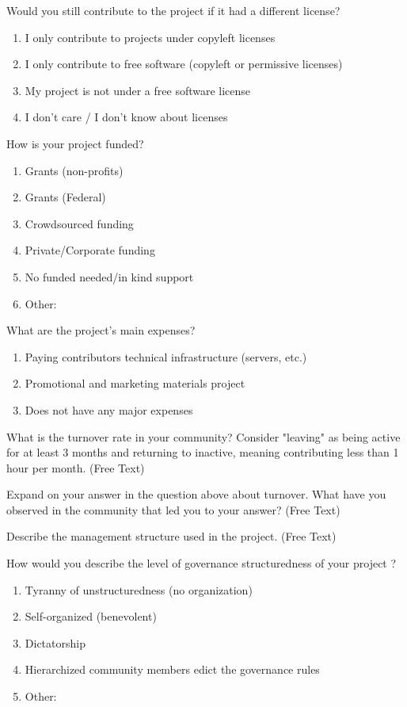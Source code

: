 Would you still contribute to the project if it had a different license?
\begin{enumerate}
\item I only contribute to projects under copyleft licenses
\item I only contribute to free software (copyleft or permissive licenses)
\item My project is not under a free software license
\item I don't care / I don't know about licenses
\end{enumerate}

How is your project funded?
\begin{enumerate}
\item Grants (non-profits)
\item Grants (Federal)
\item Crowdsourced funding
\item Private/Corporate funding
\item No funded needed/in kind support
\item Other:
\end{enumerate}

What are the project's main expenses?
\begin{enumerate}
\item Paying contributors technical infrastructure (servers, etc.)
\item Promotional and marketing materials project
\item Does not have any major expenses
\end{enumerate}

What is the turnover rate in your community? Consider "leaving" as being active for at least 3 months and returning to inactive, meaning contributing less than 1 hour per month. (Free Text)

Expand on your answer in the question above about turnover. What have you observed in the community that led you to your answer? (Free Text)

Describe the management structure used in the project. (Free Text)

How would you describe the level of governance structuredness of your project ?
\begin{enumerate}
\item Tyranny of unstructuredness (no organization)
\item Self-organized (benevolent)
\item Dictatorship
\item Hierarchized community members edict the governance rules
\item Other:
\end{enumerate}

